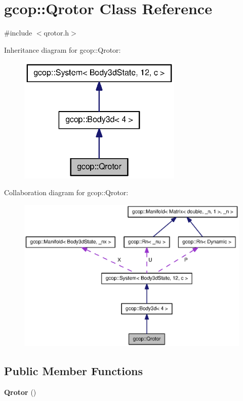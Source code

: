\section{gcop\-:\-:\-Qrotor \-Class \-Reference}
\label{classgcop_1_1Qrotor}


{\ttfamily \#include $<$qrotor.\-h$>$}



\-Inheritance diagram for gcop\-:\-:\-Qrotor\-:\nopagebreak
\begin{figure}[H]
\begin{center}
\leavevmode
\includegraphics[width=222pt]{classgcop_1_1Qrotor__inherit__graph}
\end{center}
\end{figure}


\-Collaboration diagram for gcop\-:\-:\-Qrotor\-:\nopagebreak
\begin{figure}[H]
\begin{center}
\leavevmode
\includegraphics[width=350pt]{classgcop_1_1Qrotor__coll__graph}
\end{center}
\end{figure}
\subsection*{\-Public \-Member \-Functions}
\begin{DoxyCompactItemize}
\item 
{\bf \-Qrotor} ()
\end{DoxyCompactItemize}
